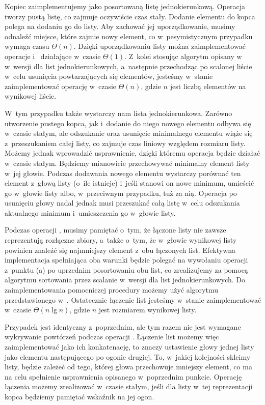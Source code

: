 
\subproblem %
Kopiec zaimplementujemy jako posortowaną listę jednokierunkową.
Operacja  tworzy pustą listę, co zajmuje oczywiście czas stały.
Dodanie elementu do kopca polega na dodaniu go do listy.
Aby zachować jej uporządkowanie, musimy odnaleźć miejsce, które zajmie nowy element, co w~pesymistycznym przypadku wymaga czasu $\Theta(n)$.
Dzięki uporządkowaniu listy można zaimplementować operacje  i~ działające w~czasie $\Theta(1)$.
Z~kolei stosując algorytm opisany w~ w~wersji dla list jednokierunkowych, a~następnie przechodząc po scalonej liście w~celu usunięcia powtarzających się elementów, jesteśmy w~stanie zaimplementować operację  w~czasie $\Theta(n)$, gdzie $n$ jest liczbą elementów na wynikowej liście.

\subproblem %
W~tym przypadku także wystarczy nam lista jednokierunkowa.
Zarówno utworzenie pustego kopca, jak i~dodanie do niego nowego elementu odbywa się w~czasie stałym, ale odszukanie oraz usunięcie minimalnego elementu wiąże się z~przeszukaniem całej listy, co zajmuje czas liniowy względem rozmiaru listy.
Możemy jednak wprowadzić usprawnienie, dzięki któremu operacja  będzie działać w~czasie stałym.
Będziemy mianowicie przechowywać minimalny element listy w~jej głowie.
Podczas dodawania nowego elementu wystarczy porównać ten element z~głową listy (o~ile istnieje) i~jeśli stanowi on nowe minimum, umieścić go w~głowie listy albo, w~przeciwnym przypadku, tuż za nią.
Operacja  po usunięciu głowy nadal jednak musi przeszukać całą listę w~celu odszukania aktualnego minimum i~umieszczenia go w~głowie listy.

Podczas operacji , musimy pamiętać o~tym, że łączone listy nie zawsze reprezentują rozłączne zbiory, a~także o~tym, że w~głowie wynikowej listy powinien znaleźć się najmniejszy element z~obu łączonych list.
Efektywna implementacja spełniająca oba warunki będzie polegać na wywołaniu operacji  z~punktu (a) po uprzednim posortowaniu obu list, co zrealizujemy za pomocą algorytmu sortowania przez scalanie w~wersji dla list jednokierunkowych.
Do zaimplementowania pomocniczej procedury  możemy użyć algorytmu przedstawionego w~.
Ostatecznie łączenie list jesteśmy w~stanie zaimplementować w~czasie $\Theta(n\lg n)$, gdzie $n$ jest rozmiarem wynikowej listy.

\subproblem %
Przypadek jest identyczny z~poprzednim, ale tym razem nie jest wymagane wykrywanie powtórzeń podczas operacji .
Łączenie list możemy więc zaimplementować jako ich konkatenację, to znaczy ustawienie głowy jednej listy jako elementu następującego po ogonie drugiej.
To, w~jakiej kolejności skleimy listy, będzie zależeć od tego, której głowa przechowuje mniejszy element, co ma na celu spełnienie usprawnienia opisanego w~poprzednim punkcie.
Operację łączenia możemy zrealizować w~czasie stałym, jeśli dla listy w~tej reprezentacji kopca będziemy pamiętać wskaźnik na jej ogon.

